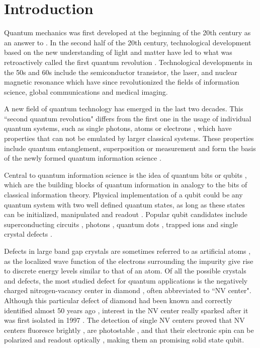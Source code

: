 \documentclass[a4paper,11pt]{report}
\title{}
\begin{document}
\chapter*{Introduction}

Quantum mechanics was first developed at the beginning of the 20th century as an answer to  . In the second half of the 20th century, technological development based on the new understanding of light and matter have led to what was retroactively called the first quantum revolution \citep{thew2019focus}. Technological developments in the 50s and 60s include the semiconductor transistor, the laser, and nuclear magnetic resonance  which have since revolutionized the fields of information science, global communications and medical imaging. 

A new field of quantum technology has emerged in the last two decades. This ``second quantum revolution" differs from the first one in the usage of individual quantum systems, such as single photons, atoms or electrons \citep{peil1999observing}, which have properties that can not be emulated by larger classical systems. These properties include quantum entanglement, superposition or measurement and form the basis of the newly formed quantum information science \citep{nielsen2002quantum, vedral2006introduction, hayashi2006quantum}. 

Central to quantum information science is the idea of quantum bits or qubits \citep{schumacher1996sending}, which are the building blocks of quantum information in analogy to the bits of classical information theory. Physical implementation of a qubit could be any quantum system with two well defined quantum states, as long as these states can be initialized, manipulated and readout \citep{divincenzo2000physical}. Popular qubit candidates include superconducting circuits \citep{nakamura1999coherent, orlando1999superconducting}, photons \citep{bennett1992quantum, zhong2020quantum}, quantum dots \citep{veldhorst2014addressable, zajac2018resonantly}, trapped ions \citep{friis2018observation, wright2019benchmarking} and single crystal defects \citep{jelezko2006single, baranov2011silicon, zhong2015optically}.

Defects in large band gap crystals are sometimes referred to as artificial atoms \citep{buluta2011natural}, as the localized wave function of the electrons surrounding the impurity  give rise to discrete energy levels similar to that of an atom. Of all the possible crystals and defects, the most studied defect for quantum applications is the negatively charged nitrogen-vacancy center in diamond \citep{aharonovich2016solid, de2021materials}, often abbreviated to ``NV center". Although this particular defect of diamond had been known and correctly identified almost 50 years ago \citep{davies1976optical}, interest in the NV center really sparked after it was first isolated in 1997 \citep{gruber1997scanning}. The detection of single NV centers proved that NV centers fluoresce brightly \citep{gruber1997scanning}, are photostable \citep{kurtsiefer2000stable}, and that their electronic spin can be polarized and readout optically \citep{jelezko2004observation}, making them an promising solid state qubit.
\end{document}
